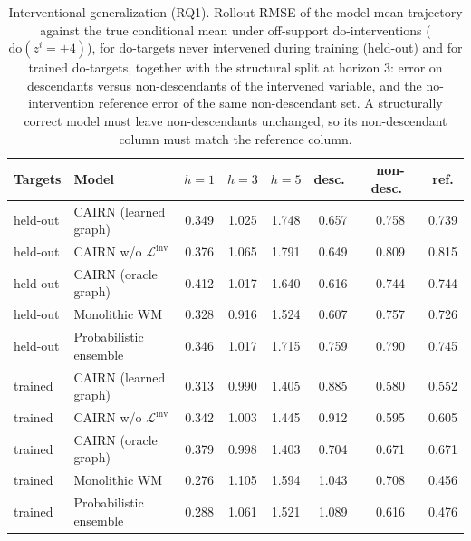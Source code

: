 \begin{table}[t]
\caption{Interventional generalization (RQ1). Rollout RMSE of the
model-mean trajectory against the true conditional mean under off-support
do-interventions ($\mathrm{do}(z^i{=}\pm 4)$), for do-targets never
intervened during training (held-out) and for trained do-targets, together
with the structural split at horizon $3$: error on descendants versus
non-descendants of the intervened variable, and the no-intervention
reference error of the same non-descendant set. A structurally correct
model must leave non-descendants unchanged, so its non-descendant column
must match the reference column.}\label{tab:rq1}
\footnotesize\setlength{\tabcolsep}{3pt}%
\begin{tabular}{llcccccc}
\toprule
Targets & Model & $h{=}1$ & $h{=}3$ & $h{=}5$ & desc.\ & non-desc.\ & ref.\\
\midrule
held-out & CAIRN (learned graph) & 0.349 & 1.025 & 1.748 & 0.657 & 0.758 & 0.739 \\
held-out & CAIRN w/o $\mathcal{L}^{\mathrm{inv}}$ & 0.376 & 1.065 & 1.791 & 0.649 & 0.809 & 0.815 \\
held-out & CAIRN (oracle graph) & 0.412 & 1.017 & 1.640 & 0.616 & 0.744 & 0.744 \\
held-out & Monolithic WM & 0.328 & 0.916 & 1.524 & 0.607 & 0.757 & 0.726 \\
held-out & Probabilistic ensemble & 0.346 & 1.017 & 1.715 & 0.759 & 0.790 & 0.745 \\
\midrule
trained & CAIRN (learned graph) & 0.313 & 0.990 & 1.405 & 0.885 & 0.580 & 0.552 \\
trained & CAIRN w/o $\mathcal{L}^{\mathrm{inv}}$ & 0.342 & 1.003 & 1.445 & 0.912 & 0.595 & 0.605 \\
trained & CAIRN (oracle graph) & 0.379 & 0.998 & 1.403 & 0.704 & 0.671 & 0.671 \\
trained & Monolithic WM & 0.276 & 1.105 & 1.594 & 1.043 & 0.708 & 0.456 \\
trained & Probabilistic ensemble & 0.288 & 1.061 & 1.521 & 1.089 & 0.616 & 0.476 \\
\bottomrule
\end{tabular}
\end{table}
